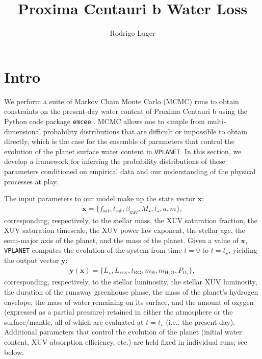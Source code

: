 \documentclass[]{emulateapj}
\begin{document}
\title{Proxima Centauri b Water Loss}
\author{Rodrigo Luger}


\section{Intro}
\label{sec:intro}

We perform a suite of Markov Chain Monte Carlo (MCMC) runs to obtain constraints on the
present-day water content of Proxima Centauri b using the Python code package \texttt{emcee}
\citep{ForemanMackey13}. MCMC allows one to sample from multi-dimensional probability 
distributions that are difficult or impossible to obtain directly, which is the case for
the ensemble of parameters that control the evolution of the planet surface water content
in \texttt{VPLANET}. In this section, we develop a framework for inferring the probability 
distributions of these parameters conditioned on empirical data and our understanding
of the physical processes at play.

The input parameters to our model make up the state vector $\mathbf{x}$:
%
\begin{align}
\label{eq:mcmcx}
\mathbf{x} = \{f_\mathrm{sat}, t_\mathrm{sat}, \beta_\mathrm{xuv}, M_\star, t_\star, a, m\},
\end{align}
%
corresponding, respectively, to the stellar mass, the XUV saturation fraction, the XUV saturation timescale,
the XUV power law exponent, the stellar age, the semi-major axis of the planet, and the
mass of the planet. Given a value of $\mathbf{x}$, \texttt{VPLANET} computes the evolution of the system from
time $t = 0$ to $t = t_\star$, yielding the output vector $\mathbf{y}$:
%
\begin{align}
\label{eq:mcmcy}
\mathbf{y}(\mathbf{x}) = \{L_\star, L_\mathrm{xuv}, t_\mathrm{RG}, m_\mathrm{H}, m_\mathrm{H_2O}, P_\mathrm{O_2}\},
\end{align}
%
corresponding, respectively, to the stellar luminosity, the stellar XUV luminosity, the duration of the 
runaway greenhouse phase, the mass of the
planet's hydrogen envelope, the mass of water remaining on its surface, and the amount of oxygen (expressed
as a partial pressure) retained
in either the atmosphere or the surface/mantle, all of which are evaluated at $t = t_\star$ (i.e., the present day). 
Additional parameters that control the evolution of the 
planet (initial water content, XUV absorption efficiency, etc.) are held fixed in individual runs; see below.
\end{document}
